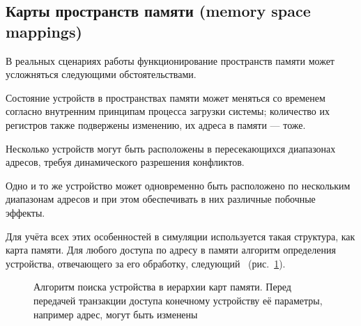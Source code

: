 \subsection[Карты пространств памяти]{Карты пространств памяти (memory space mappings)}\label{sec:mem-maps}

В реальных сценариях работы функционирование пространств памяти может усложняться следующими обстоятельствами.

\begin{itemize*}
\item Состояние устройств в пространствах памяти может меняться со временем согласно внутренним принципам процесса загрузки системы; количество их регистров также подвержены изменению, их адреса в памяти --- тоже.
\item Несколько устройств могут быть расположены в пересекающихся диапазонах адресов, требуя динамического разрешения конфликтов.
\item Одно и то же устройство может одновременно быть расположено по нескольким диапазонам адресов и при этом обеспечивать в них различные побочные эффекты.
\end{itemize*}

Для учёта всех этих особенностей в симуляции используется такая структура, как карта памяти. Для любого доступа по адресу в памяти алгоритм определения устройства, отвечающего за его обработку, следующий~\cite{simics-model-builder-guide} (рис.~\ref{fig:mapalg}).

\begin{figure}[htb]
    \centering
    \caption[Алгоритм поиска устройства в иерархии карт памяти]{Алгоритм поиска устройства в иерархии карт памяти. Перед передачей транзакции доступа конечному устройству её параметры, например адрес, могут быть изменены}
    \label{fig:mapalg}
\end{figure}

